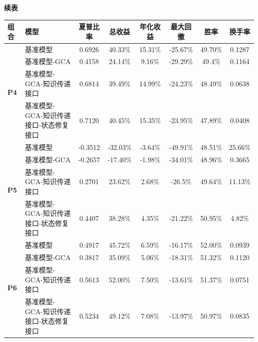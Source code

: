 \begin{table}[H]
\centering
{\small\textbf{续表}}\\[0.5em]
\small
\setlength{\tabcolsep}{3pt}
\renewcommand{\arraystretch}{1.15}
\begin{tabular}{@{}p{}p{}cccccc@{}}
\toprule
\textbf{组合} & \textbf{模型} & \textbf{夏普比率} & \textbf{总收益} & \textbf{年化收益} & \textbf{最大回撤} & \textbf{胜率} & \textbf{换手率}\\
\midrule
\multirow{4}{*}{\textbf{P4}} 
& 基准模型 & 0.6926 & 40.33\% & 15.31\% & -25.67\% & 49.70\% & 0.1287 \\
& 基准模型-GCA & 0.4158 & 24.14\% & 9.16\% & -29.29\% & 49.4\% & 0.1164\\
& 基准模型-GCA-知识传递接口 & 0.6814 & 39.49\% & 14.99\% & -24.23\% & 48.49\% & 0.0638 \\
& 基准模型-GCA-知识传递接口-状态修复接口 & 0.7120 & 40.45\% & 15.35\% & -23.95\% & 47.89\% & 0.0408\\
\midrule
\multirow{4}{*}{\textbf{P5}} 
& 基准模型 & -0.3512 & -32.03\% & -3.64\% & -49.91\% & 48.51\% & 25.66\%\\
& 基准模型-GCA & -0.2657 & -17.40\% & -1.98\% & -34.01\% & 48.96\% & 0.3665\\
& 基准模型-GCA-知识传递接口 & 0.2701 & 23.62\% & 2.68\% & -26.5\% & 49.64\% & 11.13\%\\
& 基准模型-GCA-知识传递接口-状态修复接口 & 0.4407 & 38.28\% & 4.35\% & -21.22\% & 50.95\% & 4.82\%\\
\midrule
\multirow{4}{*}{\textbf{P6}} 
& 基准模型 & 0.4917 & 45.72\% & 6.59\% & -16.17\% & 52.00\% & 0.0939\\
& 基准模型-GCA & 0.3817 & 35.09\% & 5.06\% & -18.31\% & 51.32\% & 0.1120\\
& 基准模型-GCA-知识传递接口 & 0.5613 & 52.00\% & 7.50\% & -13.61\% & 51.37\% & 0.0751 \\
& 基准模型-GCA-知识传递接口-状态修复接口 & 0.5234 & 49.12\% & 7.08\% & -13.97\% & 50.97\% & 0.0835\\
\bottomrule
\end{tabular}
\end{table}

\vspace{1em}


